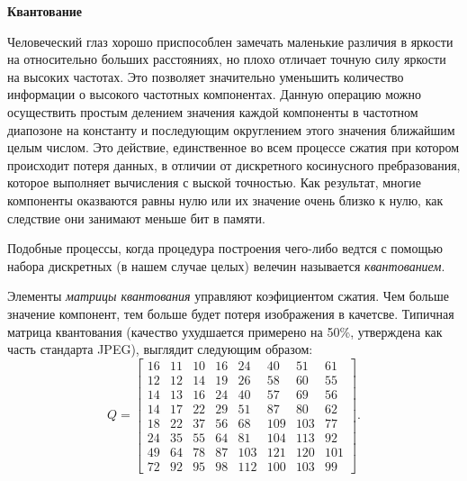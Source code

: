 \documentclass{matmex-diploma-custom}
\begin{document}
\textbf{Квантование}\newline

Человеческий глаз  хорошо приспособлен замечать маленькие различия в яркости на относительно больших расстояниях, но плохо отличает точную силу яркости на высоких частотах. Это позволяет значительно уменьшить количество информации о высокого частотных компонентах. Данную операцию можно  осуществить простым делением значения  каждой компоненты в частотном диапозоне на константу и последующим округлением этого значения ближайшим целым числом. Это действие, единственное во всем процессе сжатия при котором происходит потеря данных, в отличии от дискретного косинусного пребразования, которое выполняет вычисления с выской точностью. Как результат, многие компоненты оказваются равны  нулю или их значение очень близко к нулю, как следствие они занимают меньше бит в памяти.

Подобные процессы, когда процедура построения чего-либо ведтся с помощью набора дискретных (в нашем случае целых) велечин называется \emph{квантованием}.

Элементы \emph{матрицы квантования} управляют коэфициентом сжатия. Чем больше значение компонент, тем больше будет потеря изображения в качетсве. Типичная матрица квантования (качество ухудшается примерено на 50\%, утверждена как часть стандарта JPEG), выглядит следующим образом:
$$ Q=
     \begin{bmatrix}
      16 & 11 & 10 & 16 & 24 & 40 & 51 & 61 \\
      12 & 12 & 14 & 19 & 26 & 58 & 60 & 55 \\
      14 & 13 & 16 & 24 & 40 & 57 & 69 & 56 \\
      14 & 17 & 22 & 29 & 51 & 87 & 80 & 62 \\
      18 & 22 & 37 & 56 & 68 & 109 & 103 & 77 \\
      24 & 35 & 55 & 64 & 81 & 104 & 113 & 92 \\
      49 & 64 & 78 & 87 & 103 & 121 & 120 & 101 \\
      72 & 92 & 95 & 98 & 112 & 100 & 103 & 99
     \end{bmatrix}.
$$
\end{document}
